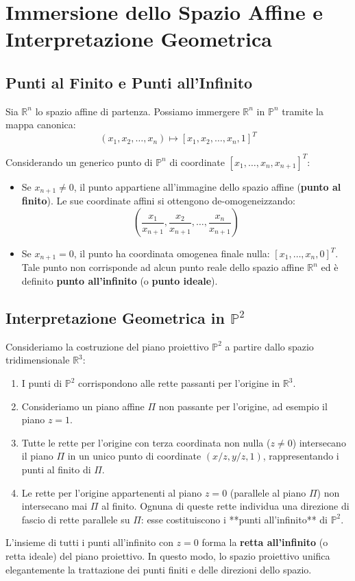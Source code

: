 \section{Immersione dello Spazio Affine e Interpretazione Geometrica}

\subsection{Punti al Finito e Punti all'Infinito}
Sia $\mathbb{R}^n$ lo spazio affine di partenza. Possiamo immergere $\mathbb{R}^n$ in $\mathbb{P}^n$ tramite la mappa canonica:
\begin{equation}
    (x_1, x_2, \dots, x_n) \longmapsto [x_1, x_2, \dots, x_n, 1]^T
\end{equation}

Considerando un generico punto di $\mathbb{P}^n$ di coordinate $[x_1, \dots, x_n, x_{n+1}]^T$:
\begin{itemize}
    \item Se $x_{n+1} \neq 0$, il punto appartiene all'immagine dello spazio affine (\textbf{punto al finito}). Le sue coordinate affini si ottengono de-omogeneizzando:
    \begin{equation}
        \left( \frac{x_1}{x_{n+1}}, \frac{x_2}{x_{n+1}}, \dots, \frac{x_n}{x_{n+1}} \right)
    \end{equation}
    \item Se $x_{n+1} = 0$, il punto ha coordinata omogenea finale nulla: $[x_1, \dots, x_n, 0]^T$. Tale punto non corrisponde ad alcun punto reale dello spazio affine $\mathbb{R}^n$ ed è definito \textbf{punto all'infinito} (o \textbf{punto ideale}).
\end{itemize}

\subsection{Interpretazione Geometrica in $\mathbb{P}^2$}
Consideriamo la costruzione del piano proiettivo $\mathbb{P}^2$ a partire dallo spazio tridimensionale $\mathbb{R}^3$:
\begin{enumerate}
    \item I punti di $\mathbb{P}^2$ corrispondono alle rette passanti per l'origine in $\mathbb{R}^3$.
    \item Consideriamo un piano affine $\Pi$ non passante per l'origine, ad esempio il piano $z = 1$.
    \item Tutte le rette per l'origine con terza coordinata non nulla ($z \neq 0$) intersecano il piano $\Pi$ in un unico punto di coordinate $(x/z, y/z, 1)$, rappresentando i punti al finito di $\Pi$.
    \item Le rette per l'origine appartenenti al piano $z = 0$ (parallele al piano $\Pi$) non intersecano mai $\Pi$ al finito. Ognuna di queste rette individua una direzione di fascio di rette parallele su $\Pi$: esse costituiscono i **punti all'infinito** di $\mathbb{P}^2$.
\end{enumerate}

L'insieme di tutti i punti all'infinito con $z = 0$ forma la \textbf{retta all'infinito} (o retta ideale) del piano proiettivo. In questo modo, lo spazio proiettivo unifica elegantemente la trattazione dei punti finiti e delle direzioni dello spazio.